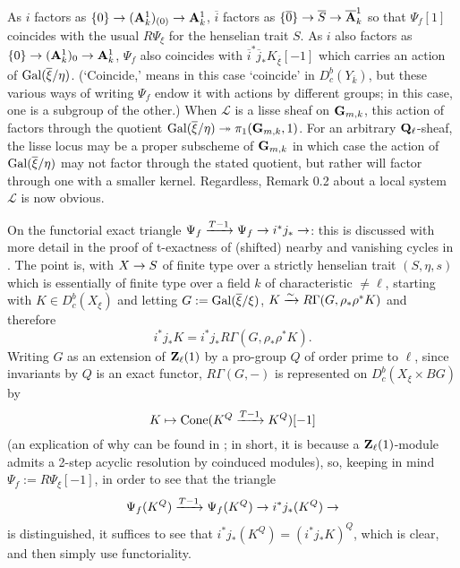 \documentclass[deligne.tex]{subfiles}
\begin{document}
As $i$ factors as $\{0\}\rightarrow(\mathbf{A}^1_k)_{(0)}\rightarrow\mathbf{A}^1_k$,
$\overline i$ factors as $\{\overline 0\}\rightarrow\overline S\rightarrow\overline{\mathbf{A}}^1_k$
so that $\Psi_f[1]$ coincides with the usual $R\Psi_\xi$ for the henselian 
trait $S$. As $i$ also factors as $\{0\}\rightarrow(\mathbf{A}^1_k)_0\rightarrow\mathbf{A}^1_k$,
$\Psi_f$ also coincides with
$\overline i^*\overline j_*K_{\overline\xi}[-1]$
which carries an action of $\operatorname{Gal}(\overline\xi/\eta)$.
(`Coincide,' means in this case `coincide' in $D_c^b(Y_{\overline k})$, but
these various ways of writing $\Psi_f$ endow it with actions by different
groups; in this case, one is a subgroup of the other.)
When $\mathscr L$ is a lisse sheaf on $\mathbf{G}_{m,k}$, this action of
factors through the quotient
$\operatorname{Gal}(\overline\xi/\eta)\twoheadrightarrow\pi_1(\mathbf{G}_{m,k},1)$.
For an arbitrary $\mathbf{Q}_\ell$-sheaf, the lisse locus may be a proper subscheme 
of $\mathbf{G}_{m,k}$ in which case the action of $\operatorname{Gal}(\overline\xi/\eta)$ may not
factor through the stated quotient, but rather will factor through one with
a smaller kernel.
Regardless, Remark 0.2 about a local system $\mathscr L$ is now obvious.



On the functorial exact triangle $\Psi_f\xrightarrow{T-1}\Psi_f\rightarrow i^*j_*\rightarrow$:
this is discussed with more detail in the proof of t-exactness of (shifted) 
nearby and vanishing cycles in \cite[Appendix A]{BBD}.
The point is, with $X\rightarrow S$ of finite type over a strictly henselian trait
$(S,\eta,s)$ which is essentially of finite type over a field $k$ of 
characteristic $\ne\ell$, starting with $K\in D_c^b(X_\xi)$ and
letting $G:=\operatorname{Gal}(\overline\xi/\xi)$, $K\xrightarrow\sim R\Gamma(G,\rho_*\rho^*K)$
and therefore
\begin{equation*}
	i^*j_*K=i^*j_*R\Gamma(G,\rho_*\rho^*K).
\end{equation*}
Writing $G$ as an extension of $\mathbf{Z}_\ell(1)$ by a pro-group $Q$
of order prime to $\ell$, since invariants by $Q$ is an exact functor,
$R\Gamma(G,-)$ is represented on $D_c^b(X_\xi\times BG)$ by
\begin{equation*}
	K\mapsto\operatorname{Cone}(K^Q\xrightarrow{T-1}K^Q)[-1]
\end{equation*}
(an explication of why can be found in \cite[10.7]{Modular}; in short, it
is because a $\mathbf{Z}_\ell(1)$-module admits a 2-step acyclic resolution by
coinduced modules),
so, keeping in mind $\Psi_f:=R\Psi_\xi[-1]$, in order to see that the triangle
\begin{equation*}
	\Psi_f(K^Q)\xrightarrow{T-1}\Psi_f(K^Q)\rightarrow i^*j_*(K^Q)\rightarrow
\end{equation*}
is distinguished, it suffices to see that $i^*j_*(K^Q)=(i^*j_*K)^Q$, which
is clear, and then simply use functoriality.
\end{document}
